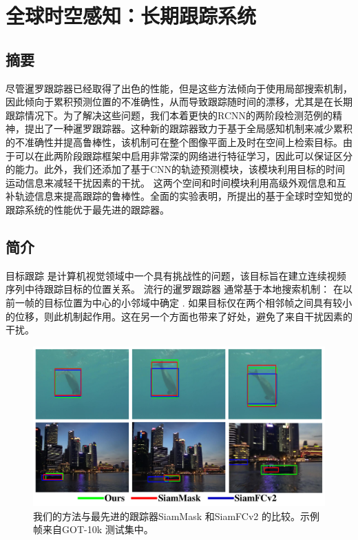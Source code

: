 \chapter{全球时空感知：长期跟踪系统}\label{chap:globally}

\section{摘要}
尽管暹罗跟踪器已经取得了出色的性能，但是这些方法倾向于使用局部搜索机制，因此倾向于累积预测位置的不准确性，从而导致跟踪随时间的漂移，尤其是在长期跟踪情况下。为了解决这些问题，我们本着更快的RCNN的两阶段检测范例的精神，提出了一种暹罗跟踪器。这种新的跟踪器致力于基于全局感知机制来减少累积的不准确性并提高鲁棒性，该机制可在整个图像平面上及时在空间上检索目标。由于可以在此两阶段跟踪框架中启用非常深的网络进行特征学习，因此可以保证区分的能力。此外，我们还添加了基于CNN的轨迹预测模块，该模块利用目标的时间运动信息来减轻干扰因素的干扰。
这两个空间和时间模块利用高级外观信息和互补轨迹信息来提高跟踪的鲁棒性。全面的实验表明，所提出的基于全球时空知觉的跟踪系统的性能优于最先进的跟踪器。

\section{简介}
\label{sec:intro}

目标跟踪 \cite{Leang2018OnlineFO, Wang2019VisualOT, Zhang2018UsingFL} 是计算机视觉领域中一个具有挑战性的问题，该目标旨在建立连续视频序列中待跟踪目标的位置关系。
流行的暹罗跟踪器 \cite{SiamFC, SiamRPN, Wang2018SiamMask} 通常基于本地搜索机制：  在以前一帧的目标位置为中心的小邻域中确定 .
如果目标仅在两个相邻帧之间具有较小的位移，则此机制起作用。这在另一个方面也带来了好处，避免了来自干扰因素的干扰。

\begin{figure}[t]
    \centering
    \includegraphics[width=1.0\textwidth]{Img/globally/visulization.pdf}
    \caption{我们的方法与最先进的跟踪器SiamMask \cite{Wang2018SiamMask} 和SiamFCv2\cite{SiamFC} 的比较。示例帧来自GOT-10k \cite{GOT-10k} 测试集中。
    }
    \label{fig:visulization}
\end{figure}

